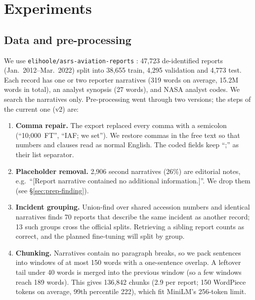 \documentclass[conference]{IEEEtran}
\begin{document}
\section{Experiments}
\subsection{Data and pre-processing}
We use \texttt{elihoole/asrs-aviation-reports} \cite{hoole2023asrs}: 47,723 de-identified
reports (Jan.\ 2012--Mar.\ 2022) split into 38,655 train, 4,295 validation and 4,773 test.
Each record has one or two reporter narratives (319 words on average, 15.2M words in total), an
analyst synopsis (27 words), and NASA analyst codes. We search the narratives only.
Pre-processing went through two versions; the steps of the current one (v2) are:
\begin{enumerate}
\item \textbf{Comma repair.} The export replaced every comma with a semicolon
(``10;000~FT'', ``IAF; we set''). We restore commas in the free text so that numbers
and clauses read as normal English. The coded fields keep ``;'' as their list separator.
\item \textbf{Placeholder removal.} 2,906 second narratives (26\%) are editorial notes,
e.g.\ ``[Report narrative contained no additional information.]''. We drop them (see
\S\ref{sec:prep-finding}).
\item \textbf{Incident grouping.} Union-find over shared accession numbers and identical
narratives finds 70 reports that describe the same incident as another record; 13 such
groups cross the official splits. Retrieving a sibling report counts as correct, and the
planned fine-tuning will split by group.
\item \textbf{Chunking.} Narratives contain no paragraph breaks, so we pack sentences
into windows of at most 150 words with a one-sentence overlap. A leftover tail under 40
words is merged into the previous window (so a few windows reach 189 words). This gives 136,842 chunks (2.9 per report;
150 WordPiece tokens on average, 99th percentile 222), which fit MiniLM's 256-token limit.
\end{enumerate}
\end{document}
